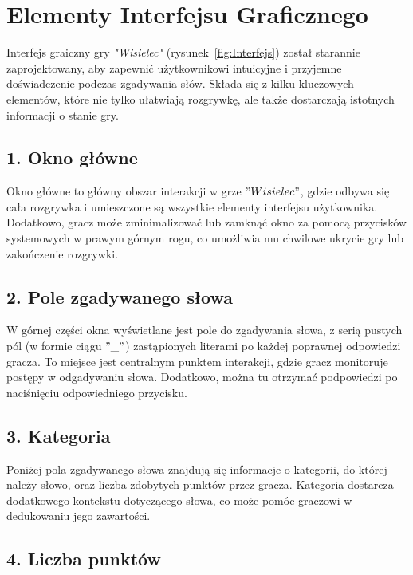 \documentclass[]{report}
\begin{document}
\section*{Elementy Interfejsu Graficznego}

Interfejs graiczny gry \textit{"Wisielec"} (rysunek~\ref{fig:Interfejs}) został starannie zaprojektowany, aby zapewnić użytkownikowi intuicyjne i przyjemne doświadczenie podczas zgadywania słów. Składa się z kilku kluczowych elementów, które nie tylko ułatwiają rozgrywkę, ale także dostarczają istotnych informacji o stanie gry.

\subsection*{1. Okno główne}

Okno główne to główny obszar interakcji w grze $"Wisielec"$, gdzie odbywa się cała rozgrywka i umieszczone są wszystkie elementy interfejsu użytkownika. Dodatkowo, gracz może zminimalizować lub zamknąć okno za pomocą przycisków systemowych w prawym górnym rogu, co umożliwia mu chwilowe ukrycie gry lub zakończenie rozgrywki.

\subsection*{2. Pole zgadywanego słowa}

W górnej części okna wyświetlane jest pole do zgadywania słowa, z serią pustych pól (w formie ciągu $"\_"$) zastąpionych literami po każdej poprawnej odpowiedzi gracza. To miejsce jest centralnym punktem interakcji, gdzie gracz monitoruje postępy w odgadywaniu słowa. Dodatkowo, można tu otrzymać podpowiedzi po naciśnięciu odpowiedniego przycisku.

\subsection*{3. Kategoria}

Poniżej pola zgadywanego słowa znajdują się informacje o kategorii, do której należy słowo, oraz liczba zdobytych punktów przez gracza. Kategoria dostarcza dodatkowego kontekstu dotyczącego słowa, co może pomóc graczowi w dedukowaniu jego zawartości.

\subsection*{4. Liczba punktów}
\end{document}
